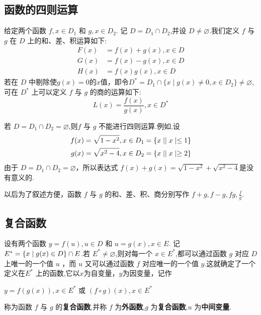\subsection{函数的四则运算}

\begin{definition}[函数的四则运算]
    给定两个函数 $f,x\in D_1$ 和 $g,x\in D_2$. 记 $D=D_1 \cap D_2$,并设 $D\ne \varnothing$.我们定义 $f$ 与 $g$ 在 $D$ 上的和、差、积运算如下:
    \begin{align*}
        F(x)&=f(x) + g(x),x\in D \\
        G(x)&=f(x) - g(x),x\in D \\
        H(x)&=f(x)g(x),x\in D 
    \end{align*}
    若在 $D$ 中剔除使$g(x)=0$的$x$值，即令$D^*=D_1\cap \{x\mid g(x)\ne 0,x\in D_2\}\ne \varnothing$,可在 $D^*$ 上可以定义 $f$ 与 $g$ 的商的运算如下:
    \[
    L(x)=\frac{f(x)}{g(x)},x\in D^*
    \]
\end{definition}

\begin{annotation}
    若 $D=D_1 \cap D_2=\varnothing$,则$f$ 与 $g$ 不能进行四则运算.例如,设
    \begin{align*}
        f(x)&=\sqrt{1-x^2},x\in D_1 = \{x\mid\mid x \mid\le 1\} \\
        g(x)&=\sqrt{x^2-4},x\in D_2 = \{x\mid\mid x \mid\ge 2\} 
    \end{align*}
    由于 $D=D_1 \cap D_2=\varnothing$，所以表达式 $f(x) + g(x)=\sqrt{1-x^2}+\sqrt{x^2-4}$是没有意义的.
\end{annotation}

以后为了叙述方便，函数 $f$ 与 $g$ 的和、差、积、商分别写作 $f+g,f-g,fg,\frac{f}{g}$.

\subsection{复合函数}
\begin{definition}[函数的复合]
    设有两个函数 $y=f(u),u\in D$ 和 $u=g(x),x\in E$. 记 $E^*=\{x\mid g(x)\in D\} \cap E$.若 $E^*\ne \varnothing
$,则对每一个 $x\in E^*$,都可以通过函数 $g$ 对应 $D$ 上唯一的一个值 $u$ ，而 $u$ 又可以通过函数 $f$ 对应唯一的一个值 $y$.这就确定了一个定义在$E^*$ 上的函数,它以$x$为自变量，$y$为因变量，记作 
    \begin{center}
        $y=f(g(x)),x\in E^*$ 或 $(f\circ g)(x),x\in E^*$ 
    \end{center}称为函数 $f$ 与 $g$ 的\textbf{复合函数},并称 $f$ 为\textbf{外函数},$g$ 为\textbf{复合函数},$u$ 为\textbf{中间变量}.
\end{definition}

